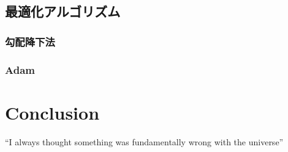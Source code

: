 \documentclass{article}
\begin{document}
\subsection{最適化アルゴリズム}

\subsubsection{勾配降下法}

\subsubsection{Adam}

\section{Conclusion}
``I always thought something was fundamentally wrong with the universe'' \citep{adams1995hitchhiker}



\end{document}
